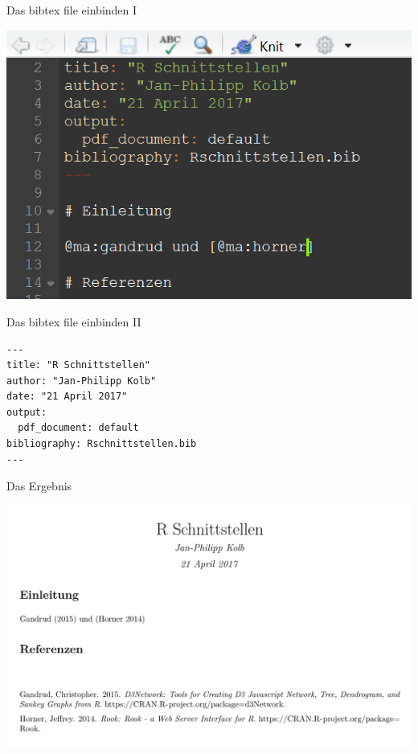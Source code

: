 \documentclass[ignorenonframetext,]{beamer}
\begin{document}
\begin{frame}{Das bibtex file einbinden I}

\includegraphics{./tex2pdf.956/86d2f3bc47d399904fe1f3925e4d98e3e254ccde.png}

\end{frame}

\begin{frame}[fragile]{Das bibtex file einbinden II}

\begin{verbatim}
---
title: "R Schnittstellen"
author: "Jan-Philipp Kolb"
date: "21 April 2017"
output: 
  pdf_document: default
bibliography: Rschnittstellen.bib
---
\end{verbatim}

\end{frame}

\begin{frame}{Das Ergebnis}

\includegraphics{./tex2pdf.956/18ffe1b5cd6ac9dbf9c22c41806c1bec1840a90a.png}

\end{frame}
\end{document}
